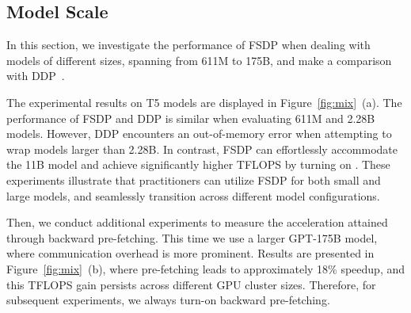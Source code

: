 

\subsection{Model Scale}\label{sec:eval_efficiency}

In this section, we investigate the performance of FSDP when dealing with models of different sizes, spanning from 611M to 175B, and make a comparison with DDP~\cite{ddp}.





The experimental results on T5 models are displayed in Figure~\ref{fig:mix}~(a). The performance of FSDP and DDP is similar when evaluating 611M and 2.28B models. However, DDP encounters an out-of-memory error when attempting to wrap models larger than 2.28B. In contrast, FSDP can effortlessly accommodate the 11B model and achieve significantly higher TFLOPS by turning on . These experiments illustrate that practitioners can utilize FSDP for both small and large models, and seamlessly transition across different model configurations.

Then, we conduct additional experiments to measure the acceleration attained through backward pre-fetching. This time we use a larger GPT-175B model, where communication overhead is more prominent. Results are presented in Figure~\ref{fig:mix}~(b), where pre-fetching leads to approximately 18\% speedup, and this TFLOPS gain persists across different GPU cluster sizes. Therefore, for subsequent experiments, we always turn-on backward pre-fetching. 





